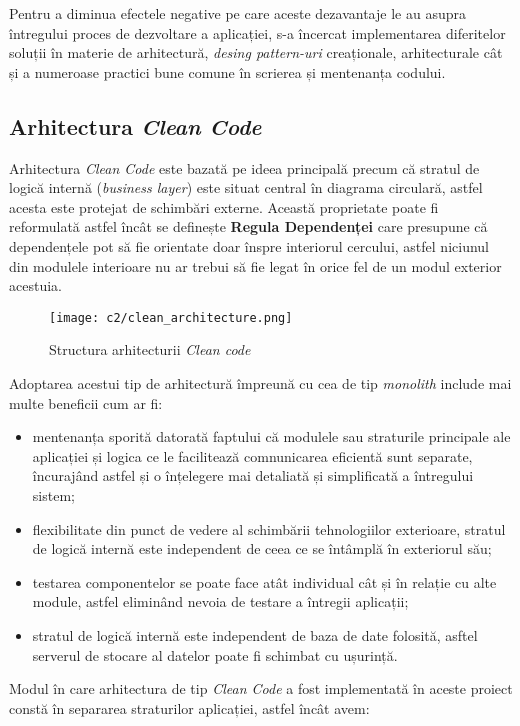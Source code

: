 Pentru a diminua efectele negative pe care aceste dezavantaje le au asupra întregului proces de dezvoltare a aplicației, s-a încercat implementarea diferitelor soluții în materie de arhitectură,  \textit{desing pattern-uri} creaționale, arhitecturale cât și a numeroase practici bune comune în scrierea și mentenanța codului.

\subsection*{Arhitectura \textit{Clean Code}}
Arhitectura \textit{Clean Code } este bazată pe ideea principală precum că stratul de logică internă (\textit{business layer}) este situat central în diagrama circulară, astfel acesta este protejat de schimbări externe. Această proprietate poate fi reformulată astfel încât se definește \textbf{Regula Dependenței} care presupune că dependențele pot să fie orientate doar înspre interiorul cercului, astfel niciunul din modulele interioare nu ar trebui să fie legat în orice fel de un modul exterior acestuia.

\begin{figure}[h]
	\centering
	
	\texttt{[image: c2/clean\_architecture.png]}
	\caption{Structura arhitecturii \textit{Clean code}}
\end{figure}

Adoptarea acestui tip de arhitectură împreună cu cea de tip \textit{monolith} include mai multe beneficii cum ar fi:

\begin{itemize}

	\item mentenanța sporită datorată faptului că modulele sau straturile principale ale aplicației și logica ce le facilitează comnunicarea eficientă sunt separate, încurajând astfel și o înțelegere mai detaliată și simplificată a întregului sistem;
	
	\item flexibilitate din punct de vedere al schimbării tehnologiilor exterioare, stratul de logică internă este independent de ceea ce se întâmplă în exteriorul său;
	
	\item testarea componentelor se poate face atât individual cât și în relație cu alte module, astfel eliminând nevoia de testare a întregii aplicații;
	
	\item stratul de logică internă este independent de baza de date folosită, asftel serverul de stocare al datelor poate fi schimbat cu ușurință.

\end{itemize} 
Modul în care arhitectura de tip \textit{Clean Code} a fost implementată în aceste proiect constă în separarea straturilor aplicației, astfel încât avem:

